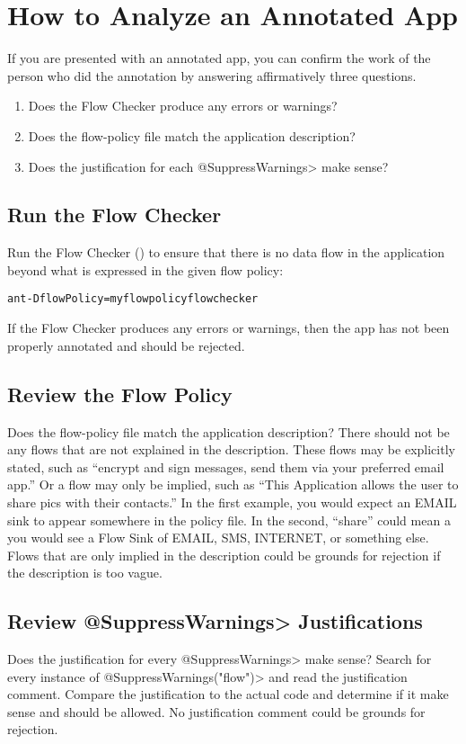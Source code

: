 \htmlhr
\chapter{How to Analyze an Annotated App\label{analyze-annotated-app}}

If you are presented with an annotated app, you can confirm the work of the
person who did the annotation by answering affirmatively three questions.

\begin{enumerate}
\item Does the Flow Checker produce any errors or warnings?
\item Does the flow-policy file match the application description?
\item Does the justification for each \<@SuppressWarnings> make sense?
\end{enumerate}

\section{Run the Flow Checker}

Run the Flow Checker () to ensure that there is no
data flow in the application beyond what is expressed in the given flow
policy:

\begin{alltt}
ant -DflowPolicy=myflowpolicy flowchecker
\end{alltt}

If the Flow Checker produces any errors or warnings, then the app has not
been properly annotated and should be rejected.

\section{Review the Flow Policy}
Does the flow-policy file match the application description? There should
not be any flows that are not explained in the description.  These flows
may be explicitly stated, such as ``encrypt and sign messages, send them
via your preferred email app.''  Or a flow may only be implied, such as
``This Application allows the user to share pics with their contacts.''  In
the first example, you would expect an EMAIL sink to appear somewhere in
the policy file. In the second, ``share'' could mean a you would see a Flow
Sink of EMAIL, SMS, INTERNET, or something else.  Flows that are only
implied in the description could be grounds for rejection if the
description is too vague.

\section{Review \<@SuppressWarnings> Justifications}
Does the justification for every \<@SuppressWarnings> make sense? Search
for every instance of \<@SuppressWarnings("flow")> and read the
justification comment.  Compare the justification to the actual code and
determine if it make sense and should be allowed.  No justification comment
could be grounds for rejection.
  

